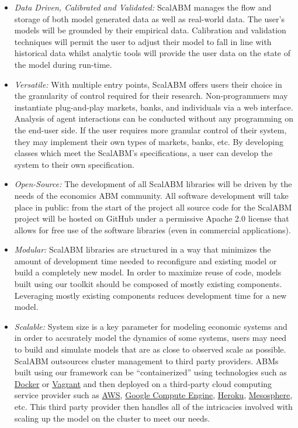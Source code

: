 \documentclass[a4paper]{article}
\begin{document}
\begin{itemize}

\item \textit{Data Driven, Calibrated and Validated:} ScalABM manages the flow and storage of both model generated data as well as real-world data. The user's models will be grounded by their empirical data. Calibration and validation techniques will permit the user to adjust their model to fall in line with historical data whilst analytic tools will provide the user data on the state of the model during run-time.

\item\textit{Versatile:} With multiple entry points, ScalABM offers users their choice in the granularity of control required for their research. Non-programmers may instantiate plug-and-play markets, banks, and individuals via a web interface. Analysis of agent interactions can be conducted without any programming on the end-user side. If the user requires more granular control of their system, they may implement their own types of markets, banks, etc. By developing classes which meet the ScalABM's specifications, a user can develop the system to their own specification.

\item \textit{Open-Source:} The development of all ScalABM libraries will be driven by the needs of the economics ABM community. All software development will take place in public: from the start of the project all source code for the ScalABM project will be hosted on GitHub under a permissive Apache 2.0 license that allows for free use of the software libraries (even in commercial applications).

\item \textit{Modular:} ScalABM libraries are structured in a way that minimizes the amount of development time needed to reconfigure and existing model or build a completely new model. In order to maximize reuse of code, models built using our toolkit should be composed of mostly existing components. Leveraging mostly existing components reduces development time for a new model.

\item \textit{Scalable:} System size is a key parameter for modeling economic systems and in order to accurately model the dynamics of some systems, users may need to build and simulate models that are as close to observed scale as possible. ScalABM outsources cluster management to third party providers. ABMs built using our framework can be ``containerized'' using technologies such as \href{https://www.docker.com/}{Docker} or \href{https://www.vagrantup.com/}{Vagrant} and then deployed on a third-party cloud computing service provider such as \href{http://aws.amazon.com/}{AWS}, \href{https://cloud.google.com/compute/}{Google Compute Engine}, \href{https://www.heroku.com/}{Heroku}, \href{https://mesosphere.com/}{Mesosphere}, etc. This third party provider then handles all of the intricacies involved with scaling up the model on the cluster to meet our needs.
    

\end{itemize}
\end{document}
